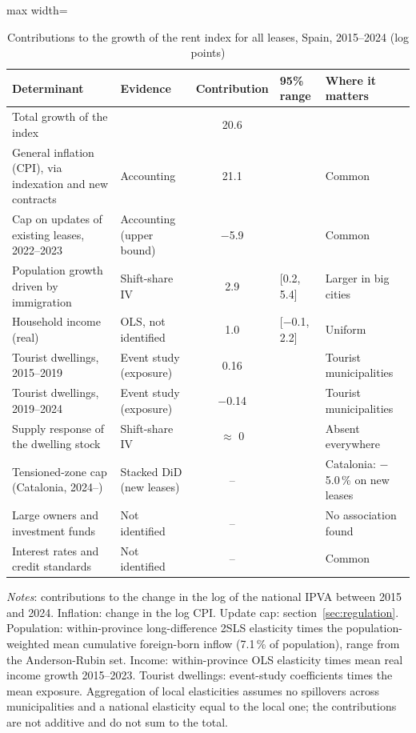 \begin{table}[!htbp]\centering\small
\caption{Contributions to the growth of the rent index for all leases, Spain, 2015--2024 (log points)}\label{tab:ranking}
\begin{adjustbox}{max width=\linewidth}\begin{tabular}{llcll}\toprule
Determinant & Evidence & Contribution & 95\% range & Where it matters\\\midrule
Total growth of the index & & 20.6 & & \\
\addlinespace
General inflation (CPI), via indexation and new contracts & Accounting & 21.1 &  & Common\\
Cap on updates of existing leases, 2022--2023 & Accounting (upper bound) & $-$5.9 &  & Common\\
Population growth driven by immigration & Shift-share IV & 2.9 & [0.2, 5.4] & Larger in big cities\\
Household income (real) & OLS, not identified & 1.0 & [$-$0.1, 2.2] & Uniform\\
Tourist dwellings, 2015--2019 & Event study (exposure) & 0.16 &  & Tourist municipalities\\
Tourist dwellings, 2019--2024 & Event study (exposure) & $-$0.14 &  & Tourist municipalities\\
Supply response of the dwelling stock & Shift-share IV & $\approx$ 0 &  & Absent everywhere\\
Tensioned-zone cap (Catalonia, 2024--) & Stacked DiD (new leases) & -- &  & Catalonia: $-$5.0\,\% on new leases\\
Large owners and investment funds & Not identified & -- &  & No association found\\
Interest rates and credit standards & Not identified & -- &  & Common\\
\bottomrule\end{tabular}\end{adjustbox}
\begin{minipage}{0.97\linewidth}\footnotesize\vspace{4pt}
\textit{Notes}: contributions to the change in the log of the national IPVA between 2015 and 2024. Inflation: change in the log CPI. Update cap: section~\ref{sec:regulation}. Population: within-province long-difference 2SLS elasticity times the population-weighted mean cumulative foreign-born inflow (7.1\,\% of population), range from the Anderson-Rubin set. Income: within-province OLS elasticity times mean real income growth 2015--2023. Tourist dwellings: event-study coefficients times the mean exposure. Aggregation of local elasticities assumes no spillovers across municipalities and a national elasticity equal to the local one; the contributions are not additive and do not sum to the total.
\end{minipage}\end{table}